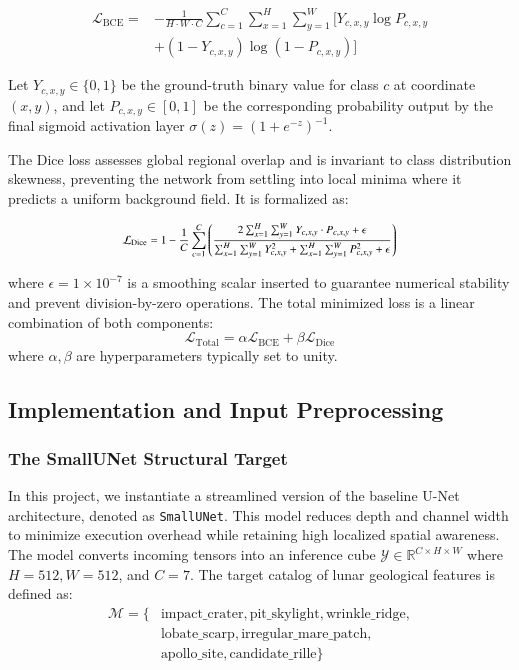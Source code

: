 \documentclass{aa}
\begin{document}
\begin{equation}
\begin{aligned}
\mathcal{L}_{\text{BCE}} = & -\frac{1}{H \cdot W \cdot C} \sum_{c=1}^{C} \sum_{x=1}^{H} \sum_{y=1}^{W} \bigl[ Y_{c,x,y}\log P_{c,x,y} \\
& + (1 - Y_{c,x,y})\log(1 - P_{c,x,y}) \bigr]
\end{aligned}
\end{equation}

Let $Y_{c,x,y} \in \{0, 1\}$ be the ground-truth binary value for class $c$ at coordinate $(x,y)$, and let $P_{c,x,y} \in [0, 1]$ be the corresponding probability output by the final sigmoid activation layer $\sigma(z) = (1 + e^{-z})^{-1}$.

The Dice loss assesses global regional overlap and
is invariant to class distribution skewness, preventing the network from settling into local minima where it predicts a uniform background field. It is formalized as:

\begin{equation*}
\text{\footnotesize $ \displaystyle \mathcal{L}_{\text{Dice}} = 1 - \frac{1}{C}\sum_{c=1}^{C} \left( \frac{2 \sum_{x=1}^{H}\sum_{y=1}^{W} Y_{c,x,y} \cdot P_{c,x,y} + \epsilon}{\sum_{x=1}^{H}\sum_{y=1}^{W} Y_{c,x,y}^2 + \sum_{x=1}^{H}\sum_{y=1}^{W} P_{c,x,y}^2 + \epsilon} \right) $}
\end{equation*}

where $\epsilon = 1\times 10^{-7}$ is a smoothing scalar inserted to guarantee numerical stability and prevent division-by-zero operations. The total minimized loss is a linear combination of both components:
\begin{equation*}
\mathcal{L}_{\text{Total}} = \alpha \mathcal{L}_{\text{BCE}} + \beta \mathcal{L}_{\text{Dice}}
\end{equation*}
where $\alpha, \beta$ are hyperparameters typically set to unity.

\subsection{Implementation and Input Preprocessing}
\subsubsection{The SmallUNet Structural Target}
In this project, we instantiate a streamlined version of the baseline U-Net architecture, denoted as \texttt{SmallUNet}. This model reduces depth and channel width to minimize execution overhead while retaining high localized spatial awareness. The model converts incoming tensors into an inference cube $\mathcal{Y} \in \mathbb{R}^{C \times H \times W}$ where $H=512, W=512$, and $C=7$. The target catalog of lunar geological features is defined as:
\begin{align*}
\mathcal{M} = \{ & \text{impact\_crater}, \text{pit\_skylight}, \text{wrinkle\_ridge}, \\
& \text{lobate\_scarp}, \text{irregular\_mare\_patch}, \\
& \text{apollo\_site}, \text{candidate\_rille} \}
\end{align*}
\end{document}
